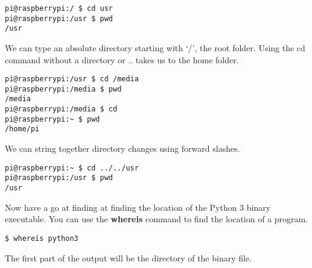 \begin{lstlisting}
pi@raspberrypi:/ $ cd usr
pi@raspberrypi:/usr $ pwd
/usr
\end{lstlisting}

		We can type an absolute directory starting with `/', the root folder. Using the cd command without a directory or .. takes us to the home folder.
		
\begin{lstlisting}
pi@raspberrypi:/usr $ cd /media
pi@raspberrypi:/media $ pwd
/media
pi@raspberrypi:/media $ cd
pi@raspberrypi:~ $ pwd
/home/pi
\end{lstlisting}

		We can string together directory changes using forward slashes.
		
\begin{lstlisting}
pi@raspberrypi:~ $ cd ../../usr
pi@raspberrypi:/usr $ pwd
/usr
\end{lstlisting}

		Now have a go at finding at finding the location of the Python 3 binary executable. You can use the \textbf{whereis} command to find the location of a program.
		
\begin{lstlisting}
$ whereis python3
\end{lstlisting}

		The first part of the output will be the directory of the binary file.